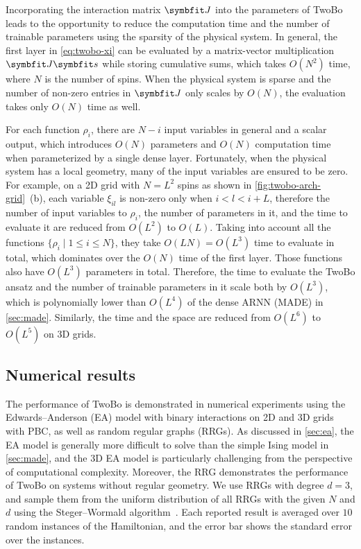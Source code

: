 Incorporating the interaction matrix $\mJ$ into the parameters of TwoBo leads to the opportunity to reduce the computation time and the number of trainable parameters using the sparsity of the physical system. In general, the first layer in \cref{eq:twobo-xi} can be evaluated by a matrix-vector multiplication $\mJ \vs$ while storing cumulative sums, which takes $O(N^2)$ time, where $N$ is the number of spins. When the physical system is sparse and the number of non-zero entries in $\mJ$ only scales by $O(N)$, the evaluation takes only $O(N)$ time as well.

For each function $\rho_i$, there are $N - i$ input variables in general and a scalar output, which introduces $O(N)$ parameters and $O(N)$ computation time when parameterized by a single dense layer. Fortunately, when the physical system has a local geometry, many of the input variables are ensured to be zero. For example, on a 2D grid with $N = L^2$ spins as shown in \cref{fig:twobo-arch-grid}~(b), each variable $\xi_{i l}$ is non-zero only when $i < l < i + L$, therefore the number of input variables to $\rho_i$, the number of parameters in it, and the time to evaluate it are reduced from $O(L^2)$ to $O(L)$. Taking into account all the functions $\{\rho_i \mid 1 \le i \le N\}$, they take $O(L N) = O(L^3)$ time to evaluate in total, which dominates over the $O(N)$ time of the first layer. Those functions also have $O(L^3)$ parameters in total. Therefore, the time to evaluate the TwoBo ansatz and the number of trainable parameters in it scale both by $O(L^3)$, which is polynomially lower than $O(L^4)$ of the dense ARNN (MADE) in \cref{sec:made}. Similarly, the time and the space are reduced from $O(L^6)$ to $O(L^5)$ on 3D grids.

\subsection{Numerical results}
\label{sec:twobo-results}

The performance of TwoBo is demonstrated in numerical experiments using the Edwards--Anderson (EA) model with binary interactions on 2D and 3D grids with PBC, as well as random regular graphs (RRGs). As discussed in \cref{sec:ea}, the EA model is generally more difficult to solve than the simple Ising model in \cref{sec:made}, and the 3D EA model is particularly challenging from the perspective of computational complexity. Moreover, the RRG demonstrates the performance of TwoBo on systems without regular geometry. We use RRGs with degree $d = 3$, and sample them from the uniform distribution of all RRGs with the given $N$ and $d$ using the Steger--Wormald algorithm~\cite{steger1999generating}. Each reported result is averaged over $10$ random instances of the Hamiltonian, and the error bar shows the standard error over the instances.

